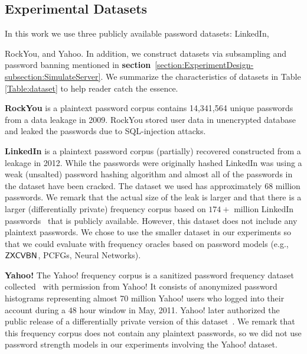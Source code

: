 \subsection{Experimental Datasets}\label{section:experiment:experiment_dataset} %
In this work we use three publicly available password datasets: LinkedIn\cite{Dataset:LinkedIn}, {RockYou\cite{Dataset:RockYou}, and Yahoo\cite{SP:Bonneau12,NDSS:BloDatBon16}. In addition, we construct datasets via subsampling and password banning mentioned in \textbf{section}~\ref{section:ExperimentDesign-subsection:SimulateServer}. We summarize the characteristics of datasets in Table \ref{Table:dataset} to help reader catch the essence. 
	
	\textbf{RockYou}\cite{Dataset:RockYou} is a plaintext password corpus contains 14,341,564 unique passwords from a data leakage in 2009. RockYou stored user data in unencrypted database and leaked the passwords due to SQL-injection attacks. %
	
	\textbf{LinkedIn}\cite{Dataset:LinkedIn} is a plaintext password corpus (partially) recovered constructed from a leakage in 2012. While the passwords were originally hashed LinkedIn was using a weak (unsalted) password hashing algorithm and almost all of the passwords in the dataset have been cracked. The dataset we used has approximately $68$ million passwords. We remark that the actual size of the leak is larger and that there is a larger (differentially private) frequency corpus based on $174+$ million LinkedIn passwords~\cite{harsha2020bicycle} that is publicly available. However, this dataset does not include any plaintext passwords. We chose to use the smaller dataset in our experiments so that we could evaluate with frequency oracles based on password models (e.g., $\mathsf{ZXCVBN}$, PCFGs, Neural Networks). 
	
	
	\textbf{Yahoo!} The Yahoo! frequency corpus is a sanitized password frequency dataset collected~\cite{SP:Bonneau12}   with permission from Yahoo! It consists of anonymized password histograms representing almost 70 million Yahoo! users who logged into their account during a $48$ hour window in May, 2011. Yahoo! later authorized the public release of a differentially private version of this dataset~\cite{NDSS:BloDatBon16}. We remark that this frequency corpus does not contain any plaintext passwords, so we did not use password strength models in our experiments involving the Yahoo! dataset.
	
}
